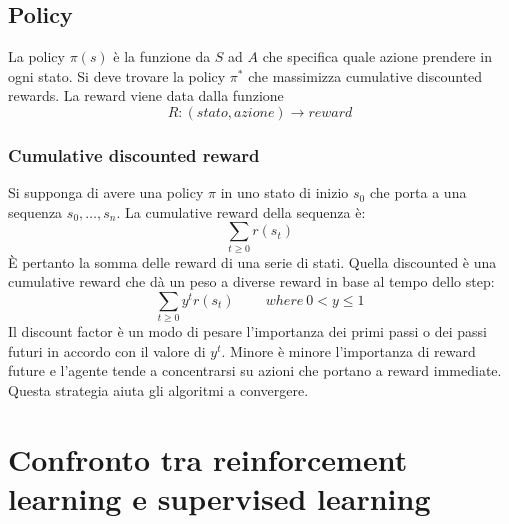 	\subsection{Policy}
	La policy $\pi(s)$ \`e la funzione da $S$ ad $A$ che specifica quale azione prendere in ogni stato.
	Si deve trovare la policy $\pi^*$ che massimizza cumulative discounted rewards.
	La reward viene data dalla funzione
	$$R:(stato, azione)\rightarrow reward$$

		\subsubsection{Cumulative discounted reward}
		Si supponga di avere una policy $\pi$ in uno stato di inizio $s_0$ che porta a una sequenza $s_0,\dots, s_n$.
		La cumulative reward della sequenza \`e:
		$$\sum\limits_{t\ge 0} r(s_t)$$
		\`E pertanto la somma delle reward di una serie di stati.
		Quella discounted \`e una cumulative reward che d\`a un peso a diverse reward in base al tempo dello step:
		$$\sum\limits_{t\ge 0} y^tr(s_t)\qquad\ where\ 0 < y\le 1$$
		Il discount factor \`e un modo di pesare l'importanza dei primi passi o dei passi futuri in accordo con il valore di $y^t$.
		Minore \`e minore l'importanza di reward future e l'agente tende a concentrarsi su azioni che portano a reward immediate.
		Questa strategia aiuta gli algoritmi a convergere.

\section{Confronto tra reinforcement learning e supervised learning}
